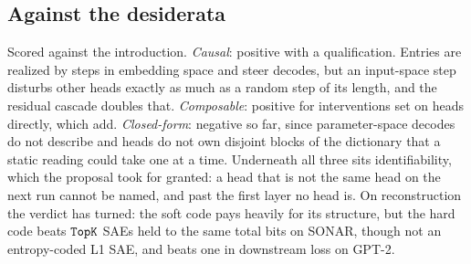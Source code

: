 \subsection{Against the desiderata}
Scored against the introduction. \emph{Causal}: positive with a
qualification. Entries are realized by steps in embedding space and
steer decodes, but an input-space step disturbs other heads exactly as
much as a random step of its length, and the residual cascade doubles
that. \emph{Composable}: positive for interventions set on heads
directly, which add. \emph{Closed-form}: negative so far, since
parameter-space decodes do not describe and heads do not own disjoint
blocks of the dictionary that a static reading could take one at a
time. Underneath all three sits
identifiability, which the proposal took for granted: a head that is not
the same head on the next run cannot be named, and past the first layer
no head is. On reconstruction the verdict has turned: the soft code pays
heavily for its structure, but the hard code beats $\mathop{\mathtt{TopK}}\limits$ SAEs held to
the same total bits on SONAR, though not an entropy-coded L1 SAE, and
beats one in downstream loss on GPT-2.
